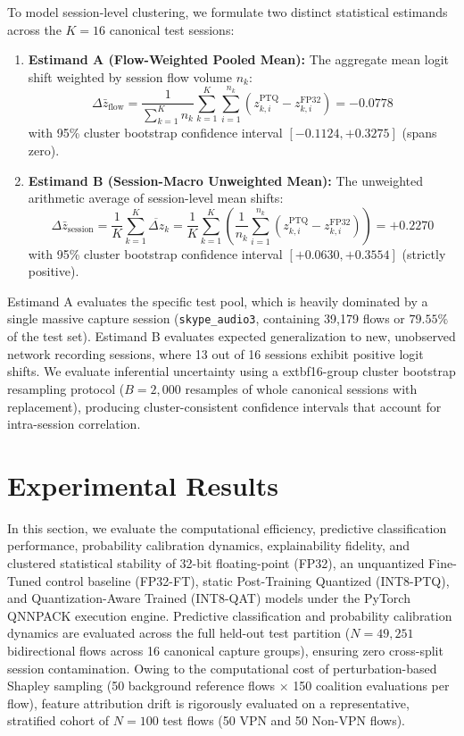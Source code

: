 \documentclass[conference]{IEEEtran}
\begin{document}
To model session-level clustering, we formulate two distinct statistical estimands across the $K = 16$ canonical test sessions:
\begin{enumerate}
    \item \textbf{Estimand A (Flow-Weighted Pooled Mean):} The aggregate mean logit shift weighted by session flow volume $n_k$:
    \begin{equation}
    \Delta \bar{z}_{\text{flow}} = \frac{1}{\sum_{k=1}^K n_k} \sum_{k=1}^K \sum_{i=1}^{n_k} (z_{k, i}^{\text{PTQ}} - z_{k, i}^{\text{FP32}}) = -0.0778
    \label{eq:estimand_a}
    \end{equation}
    with 95\% cluster bootstrap confidence interval $[-0.1124, +0.3275]$ (spans zero).
    \item \textbf{Estimand B (Session-Macro Unweighted Mean):} The unweighted arithmetic average of session-level mean shifts:
    \begin{equation}
\Delta \bar{z}_{\text{session}} = \frac{1}{K} \sum_{k=1}^K \overline{\Delta z}_k = \frac{1}{K} \sum_{k=1}^K \left( \frac{1}{n_k} \sum_{i=1}^{n_k} (z_{k, i}^{\text{PTQ}} - z_{k, i}^{\text{FP32}}) \right) = +0.2270
\label{eq:estimand_b}
\end{equation}
    with 95\% cluster bootstrap confidence interval $[+0.0630, +0.3554]$ (strictly positive).
\end{enumerate}
Estimand A evaluates the specific test pool, which is heavily dominated by a single massive capture session (\texttt{skype\_audio3}, containing 39,179 flows or $79.55\%$ of the test set). Estimand B evaluates expected generalization to new, unobserved network recording sessions, where 13 out of 16 sessions exhibit positive logit shifts. We evaluate inferential uncertainty using a 	extbf{16-group cluster bootstrap resampling protocol} ($B = 2,000$ resamples of whole canonical sessions with replacement), producing cluster-consistent confidence intervals that account for intra-session correlation.

\section{Experimental Results}

In this section, we evaluate the computational efficiency, predictive classification performance, probability calibration dynamics, explainability fidelity, and clustered statistical stability of 32-bit floating-point (FP32), an unquantized Fine-Tuned control baseline (FP32-FT), static Post-Training Quantized (INT8-PTQ), and Quantization-Aware Trained (INT8-QAT) models under the PyTorch QNNPACK execution engine. Predictive classification and probability calibration dynamics are evaluated across the full held-out test partition ($N = 49,251$ bidirectional flows across 16 canonical capture groups), ensuring zero cross-split session contamination. Owing to the computational cost of perturbation-based Shapley sampling (50 background reference flows $\times$ 150 coalition evaluations per flow), feature attribution drift is rigorously evaluated on a representative, stratified cohort of $N = 100$ test flows (50 VPN and 50 Non-VPN flows).
\end{document}
